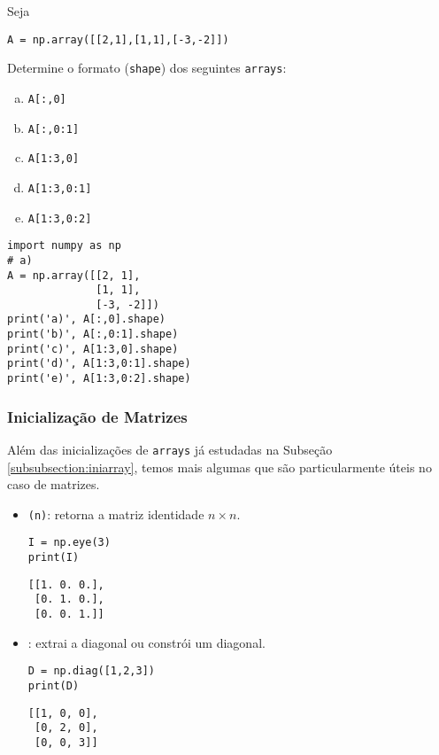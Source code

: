 \begin{exer}
  Seja

\begin{lstlisting}
A = np.array([[2,1],[1,1],[-3,-2]])
\end{lstlisting}

  Determine o formato (\texttt{shape}) dos seguintes \texttt{arrays}:
  \begin{enumerate}[a)]
  \item \texttt{A[:,0]}
  \item \texttt{A[:,0:1]}
  \item \texttt{A[1:3,0]}
  \item \texttt{A[1:3,0:1]}
  \item \texttt{A[1:3,0:2]}
  \end{enumerate}
\end{exer}
\begin{resp}
  
\begin{lstlisting}
import numpy as np
# a)
A = np.array([[2, 1],
              [1, 1],
              [-3, -2]])
print('a)', A[:,0].shape)
print('b)', A[:,0:1].shape)
print('c)', A[1:3,0].shape)
print('d)', A[1:3,0:1].shape)
print('e)', A[1:3,0:2].shape)
\end{lstlisting}

\end{resp}

\subsubsection{Inicialização de Matrizes}

Além das inicializações de \texttt{arrays} já estudadas na Subseção \ref{subsubsection:iniarray}, temos mais algumas que são particularmente úteis no caso de matrizes.
\begin{itemize}
  \item \hl{\PYTHONnumpyDOTeye}\texttt{(n)}: retorna a matriz identidade $n\times n$.

\begin{lstlisting}
I = np.eye(3)
print(I)
\end{lstlisting}

\begin{verbatim}
[[1. 0. 0.],
 [0. 1. 0.],
 [0. 0. 1.]]
\end{verbatim}

  \item \hl{\PYTHONnumpyDOTdiag}: extrai a diagonal ou constrói um {\PYTHONnumpyDOTarray} diagonal.

\begin{lstlisting}
D = np.diag([1,2,3])
print(D)
\end{lstlisting}

\begin{verbatim}
[[1, 0, 0],
 [0, 2, 0],
 [0, 0, 3]]
\end{verbatim}

\end{itemize}

